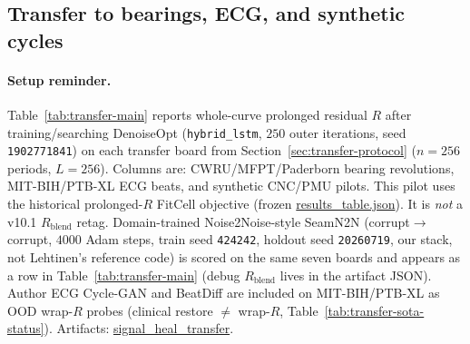 \subsection{Transfer to bearings, ECG, and synthetic cycles}
\label{sec:transfer-main}

\paragraph{Setup reminder.}
Table~\ref{tab:transfer-main} reports whole-curve prolonged residual $R$ after training/searching DenoiseOpt
(\texttt{hybrid\_lstm}, $250$ outer iterations, seed \texttt{1902771841}) on each transfer board
from Section~\ref{sec:transfer-protocol} ($n{=}256$ periods, $L{=}256$).
Columns are: CWRU/MFPT/Paderborn bearing revolutions, MIT-BIH/PTB-XL ECG beats, and synthetic CNC/PMU pilots.
This pilot uses the historical prolonged-$R$ FitCell objective (frozen
\href{https://github.com/reeldemo/reelsynth/blob/main/brand/artifacts/signal_heal_transfer/results_table.json}{results\_table.json}).
It is \emph{not} a v10.1 $R_{\mathrm{blend}}$ retag.
Domain-trained Noise2Noise-style SeamN2N (corrupt$\to$corrupt, $4000$ Adam steps, train seed \texttt{424242}, holdout seed \texttt{20260719},
our stack, not Lehtinen's reference code) is scored on the same seven boards and appears as a row in Table~\ref{tab:transfer-main}
(debug $R_{\mathrm{blend}}$ lives in the artifact JSON).
Author ECG Cycle-GAN and BeatDiff are included on MIT-BIH/PTB-XL as OOD wrap-$R$ probes
(clinical restore $\neq$ wrap-$R$, Table~\ref{tab:transfer-sota-status}).
Artifacts:
\href{https://github.com/reeldemo/reelsynth/tree/main/brand/artifacts/signal_heal_transfer}{signal\_heal\_transfer}.

